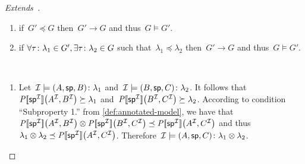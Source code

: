 \begin{proof}[Extends~\citep{MunozPerezGutierrez:2009aa}]
\begin{description}[nosep]
\begin{enumerate}[label=(\alph*),nosep]
      \ifnormalisedardf%
    \item if~$G' \preceq G$ then~$G' \to G$ and thus~$G \models G'$.%
      \else%
    \item if $\forall \mbox{$\tau\colon\lambda_{1}$} \in G', \exists\mbox{$\tau\colon\lambda_{2}$} \in G$ such
      that~$\lambda_{1} \preceq \lambda_{2}$ then~$G' \to G$ and thus~$G \models G'$.%
      \fi
    \end{enumerate}
  \item[2. Subproperty:]~ 
    \begin{enumerate}[label=(\alph*),nosep]
    \item Let~$\mathcal{I} \models \mbox{$(A, \mathsf{sp}, B)\colon\lambda_{1}$}$ and~$\mathcal{I} \models \mbox{$(B, \mathsf{sp},
          C)\colon\lambda_{2}$}$.  
      It follows that~$\mathit{{P[\![{\mathsf{sp}}^{\mathcal{I}}]\!]}}\!\left({A}^{\mathcal{I}}, {B}^{\mathcal{I}}\right) \succeq \lambda_{1}$
      and~$\mathit{{P[\![{\mathsf{sp}}^{\mathcal{I}}]\!]}}\!\left({B}^{\mathcal{I}}, {C}^{\mathcal{I}}\right) \succeq \lambda_{2}$.
      According to condition ``Subproperty 1.'' from \cref{def:annotated-model}, we have
      that~$\fc{\intP{\int{\spp}}}{\int{A}, \int{B}} \otimes \fc{\intP{\int{ \spp}}}{\int{B}, \int{C}} \preceq
      \fc{\intP{\int{ \spp}}}{\int{A}, \int{C}}$ and thus~$\lambda_{1} \otimes \lambda_{2} \preceq
      \mathit{{P[\![{\mathsf{sp}}^{\mathcal{I}}]\!]}}\!\left({A}^{\mathcal{I}}, {C}^{\mathcal{I}}\right)$.
      Therefore~$\mathcal{I} \models \mbox{$(A, \mathsf{sp}, C)\colon\lambda_{1}\otimes\lambda_{2}$}$.


\end{enumerate}
\end{description}
\end{proof}
